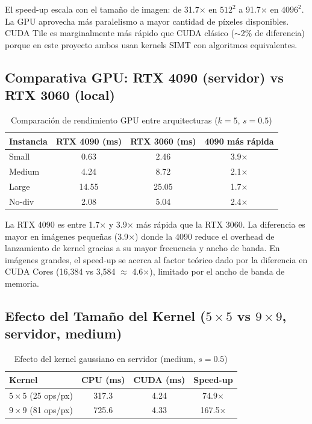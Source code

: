 \documentclass[12pt,a4paper]{article}
\begin{document}
El speed-up escala con el tama\~no de imagen: de 31.7$\times$ en $512^2$ a 91.7$\times$ en $4096^2$. La GPU aprovecha m\'as paralelismo a mayor cantidad de p\'ixeles disponibles. CUDA Tile es marginalmente m\'as r\'apido que CUDA cl\'asico ($\sim$2\% de diferencia) porque en este proyecto ambos usan kernels SIMT con algoritmos equivalentes.

\subsection{Comparativa GPU: RTX 4090 (servidor) vs RTX 3060 (local)}

\begin{table}[H]
\centering
\caption{Comparaci\'on de rendimiento GPU entre arquitecturas ($k=5$, $s=0.5$)}
\label{tab:gpu_comp}
\begin{tabular}{lccc}
\toprule
\textbf{Instancia} & \textbf{RTX 4090 (ms)} & \textbf{RTX 3060 (ms)} & \textbf{4090 m\'as r\'apida} \\
\midrule
Small    & 0.63 & 2.46 & 3.9$\times$ \\
Medium   & 4.24 & 8.72 & 2.1$\times$ \\
Large    & 14.55 & 25.05 & 1.7$\times$ \\
No-div   & 2.08 & 5.04 & 2.4$\times$ \\
\bottomrule
\end{tabular}
\end{table}

La RTX 4090 es entre 1.7$\times$ y 3.9$\times$ m\'as r\'apida que la RTX 3060. La diferencia es mayor en im\'agenes peque\~nas (3.9$\times$) donde la 4090 reduce el overhead de lanzamiento de kernel gracias a su mayor frecuencia y ancho de banda. En im\'agenes grandes, el speed-up se acerca al factor te\'orico dado por la diferencia en CUDA Cores (16,384 vs 3,584 $\approx$ 4.6$\times$), limitado por el ancho de banda de memoria.

\subsection{Efecto del Tama\~no del Kernel ($5\times5$ vs $9\times9$, servidor, medium)}

\begin{table}[H]
\centering
\caption{Efecto del kernel gaussiano en servidor (medium, $s=0.5$)}
\label{tab:kernel_effect}
\begin{tabular}{lccc}
\toprule
\textbf{Kernel} & \textbf{CPU (ms)} & \textbf{CUDA (ms)} & \textbf{Speed-up} \\
\midrule
$5 \times 5$ (25 ops/px)  & 317.3 & 4.24 & 74.9$\times$ \\
$9 \times 9$ (81 ops/px)  & 725.6 & 4.33 & 167.5$\times$ \\
\bottomrule
\end{tabular}
\end{table}
\end{document}
